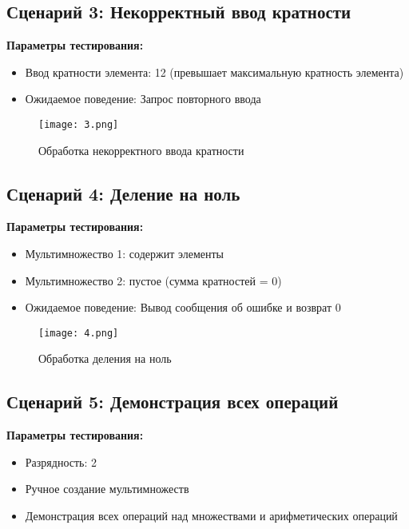 \documentclass[12pt,a4paper]{article}
\begin{document}
\subsection{Сценарий 3: Некорректный ввод кратности}

\textbf{Параметры тестирования:}
\begin{itemize}
    \item Ввод кратности элемента: 12 (превышает максимальную кратность элемента)
    \item Ожидаемое поведение: Запрос повторного ввода
\end{itemize}

\begin{figure}[h]
    \centering
    \texttt{[image: 3.png]}
    \caption{Обработка некорректного ввода кратности}
    \label{fig:invalid_multiplicity}
\end{figure}

\subsection{Сценарий 4: Деление на ноль}

\textbf{Параметры тестирования:}
\begin{itemize}
    \item Мультимножество 1: содержит элементы
    \item Мультимножество 2: пустое (сумма кратностей = 0)
    \item Ожидаемое поведение: Вывод сообщения об ошибке и возврат 0
\end{itemize}

\begin{figure}[h]
    \centering
    \texttt{[image: 4.png]}
    \caption{Обработка деления на ноль}
    \label{fig:division_by_zero}
\end{figure}

\subsection{Сценарий 5: Демонстрация всех операций}

\textbf{Параметры тестирования:}
\begin{itemize}
    \item Разрядность: 2
    \item Ручное создание мультимножеств
    \item Демонстрация всех операций над множествами и арифметических операций
\end{itemize}
\end{document}

